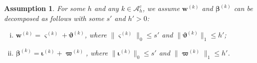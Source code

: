 \documentclass[12pt]{article}
\newcommand{\onenorm}[1]{\|#1\|_{1}}
\newcommand{\zeronorm}[1]{\|#1\|_{0}}
\newcommand{\bbetak}[1]{\bm{\beta}^{(#1)}}
\newcommand{\bwk}[1]{\bm{w}^{(#1)}}
\newcommand{\mach}{\mathcal{A}^c_h}
\newcommand{\<}{\langle}
\renewcommand{\>}{\rangle}
\newtheorem{assumption}{Assumption}
\begin{document}
\begin{assumption}\label{asmp: merging detection}
For some $h$ and any $k \in \mach$, we assume $\bwk{k}$ and $\bbetak{k}$ can be decomposed as follows with some $s'$ and $h' > 0$:
\begin{enumerate}[(i)]
	\item $\bwk{k} = \bm{\varsigma}^{(k)} + \bm{\vartheta}^{(k)}$, where $\zeronorm{\bm{\varsigma}^{(k)}} \leq s'$ and  $\onenorm{\bm{\vartheta}^{(k)}} \leq h'$;
	\item $\bbetak{k} = \bm{\iota}^{(k)} + \bm{\varpi}^{(k)}$, where $\zeronorm{\bm{\iota}^{(k)}} \leq s'$ and  $\onenorm{\bm{\varpi}^{(k)}} \leq h'$.
\end{enumerate}
\end{assumption}
\end{document}
